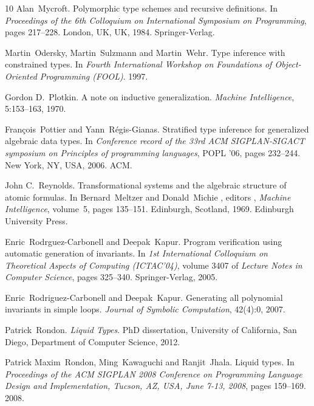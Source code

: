 \documentclass{article}
\newcommand{\tmtextit}[1]{{\itshape{#1}}}
\begin{document}
\begin{thebibliography}{10}
  Alan~Mycroft.{\newblock} Polymorphic type schemes and
  recursive definitions.{\newblock} In \tmtextit{Proceedings of the 6th
  Colloquium on International Symposium on Programming},  pages  217--228.
  London, UK, UK, 1984. Springer-Verlag.{\newblock}
  
  Martin~Odersky, Martin~Sulzmann  and 
  Martin~Wehr.{\newblock} Type inference with constrained types.{\newblock} In
  \tmtextit{Fourth International Workshop on Foundations of Object-Oriented
  Programming (FOOL)}. 1997.{\newblock}
  
  Gordon D.~Plotkin.{\newblock} A note on
  inductive generalization.{\newblock} \tmtextit{Machine Intelligence},
  5:153--163, 1970.{\newblock}
  
  Fran{\c c}ois~Pottier  and 
  Yann~R{\'e}gis-Gianas.{\newblock} Stratified type inference for generalized
  algebraic data types.{\newblock} In \tmtextit{Conference record of the 33rd
  ACM SIGPLAN-SIGACT symposium on Principles of programming languages}, POPL
  '06,  pages  232--244. New York, NY, USA, 2006. ACM.{\newblock}
  
  John C.~Reynolds.{\newblock} Transformational
  systems and the algebraic structure of atomic formulas.{\newblock} In 
  Bernard~Meltzer  and  Donald~Michie , editors , \tmtextit{Machine
  Intelligence},  volume~5,  pages  135--151. Edinburgh, Scotland, 1969.
  Edinburgh University Press.{\newblock}
  
  Enric~Rodrguez-Carbonell  and 
  Deepak~Kapur.{\newblock} Program verification using automatic generation of
  invariants.{\newblock} In \tmtextit{1st International Colloquium on
  Theoretical Aspects of Computing (ICTAC'04)},  volume  3407  of
  \tmtextit{Lecture Notes in Computer Science},  pages  325--340.
  Springer-Verlag, 2005.{\newblock}
  
  Enric~Rodriguez-Carbonell  and 
  Deepak~Kapur.{\newblock} Generating all polynomial invariants in simple
  loops.{\newblock} \tmtextit{Journal of Symbolic Computation}, 42(4):0,
  2007.{\newblock}
  
  Patrick~Rondon.{\newblock} \tmtextit{Liquid
  Types}.{\newblock} PhD dissertation, University of California, San Diego,
  Department of Computer Science, 2012.{\newblock}
  
  Patrick Maxim~Rondon, Ming~Kawaguchi  and 
  Ranjit~Jhala.{\newblock} Liquid types.{\newblock} In \tmtextit{Proceedings
  of the ACM SIGPLAN 2008 Conference on Programming Language Design and
  Implementation, Tucson, AZ, USA, June 7-13, 2008},  pages  159--169.
  2008.{\newblock}
  

\end{thebibliography}
\end{document}
